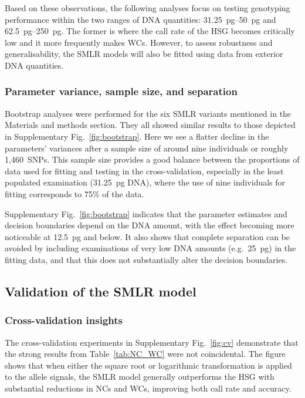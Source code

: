 \documentclass[preprint,5p,times,11pt]{elsarticle}
\begin{document}
Based on these observations, the following analyses focus on testing genotyping performance within the two ranges of DNA quantities: \SIrange[range-units = single, range-phrase = --]{31.25}{50}{\pg} and \SIrange[range-units = single, range-phrase = --]{62.5}{250}{\pg}.
The former is where the call rate of the HSG becomes critically low and it more frequently makes WCs.
However, to assess robustness and generalisability, the SMLR models will also be fitted using data from exterior DNA quantities.


\subsubsection{Parameter variance, sample size, and separation}
Bootstrap analyses were performed for the six SMLR variants mentioned in the Materials and methods section.
They all showed similar results to those depicted in Supplementary Fig.~\ref{fig:bootstrap}.
Here we see a flatter decline in the parameters’ variances after a sample size of around nine individuals or roughly 1,460~SNPs.
This sample size provides a good balance between the proportions of data used for fitting and testing in the cross-validation, especially in the least populated examination (\SI{31.25}{\pg} DNA), where the use of nine individuals for fitting corresponds to 75\% of the data.

Supplementary Fig.~\ref{fig:bootstrap} indicates that the parameter estimates and decision boundaries depend on the DNA amount, with the effect becoming more noticeable at \SI{12.5}{\pg} and below.
It also shows that complete separation can be avoided by including examinations of very low DNA amounts (e.g.~\SI{25}{\pg}) in the fitting data, and that this does not substantially alter the decision boundaries.


\subsection{Validation of the SMLR model}
\subsubsection{Cross-validation insights}
The cross-validation experiments in Supplementary Fig.~\ref{fig:cv} demonstrate that the strong results from Table~\ref{tab:NC_WC} were not coincidental.
The figure shows that when either the square root or logarithmic transformation is applied to the allele signals, the SMLR model generally outperforms the HSG with substantial reductions in NCs and WCs, improving both call rate and accuracy.
\end{document}
